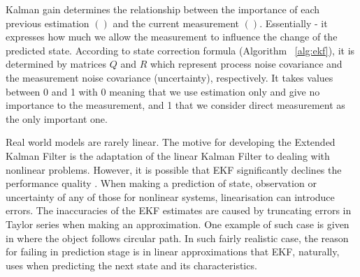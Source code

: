 
Kalman gain determines the relationship between the importance of each previous estimation $()$ and the current measurement $()$. Essentially - it expresses how much we allow the measurement to influence the change of the predicted state. According to state correction formula (Algorithm ~\ref{alg:ekf}), it is determined by matrices $Q$ and $R$ which represent process noise covariance and the measurement noise covariance (uncertainty), respectively. It takes values between 0 and 1 with 0 meaning that we use estimation only and give no importance to the measurement, and 1 that we consider direct measurement as the only important one.   

Real world models are rarely linear. The motive for developing the Extended Kalman Filter is the adaptation of the linear Kalman Filter to dealing with nonlinear problems. However, it is possible that EKF significantly declines the performance quality \cite{julier96}. When making a prediction of state, observation or uncertainty of any of those for nonlinear systems, linearisation can introduce errors. The inaccuracies of the EKF estimates are caused by truncating errors in Taylor series when making an approximation. One example of such case is given in \cite{julier96} where the object follows circular path. In such fairly realistic case, the reason for failing in prediction stage is in linear approximations that EKF, naturally, uses when predicting the next state and its characteristics.
